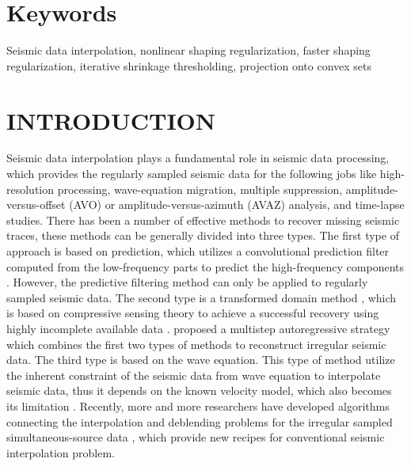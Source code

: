 \section{Keywords}
Seismic data interpolation, nonlinear shaping regularization, faster shaping regularization, iterative shrinkage thresholding, projection onto convex sets

\section{INTRODUCTION}
Seismic data interpolation plays a fundamental role in seismic data processing, which provides the regularly sampled seismic data for the following jobs like high-resolution processing, wave-equation migration, multiple suppression, amplitude-versus-offset (AVO) or amplitude-versus-azimuth (AVAZ) analysis, and time-lapse studies. There has been a number of effective methods to recover missing seismic traces, these methods can be generally divided into three types. The first type of approach is based on prediction, which utilizes a convolutional prediction filter computed from the low-frequency parts to predict the high-frequency components \cite[]{spitz1991,porsani1999,wang2002}. However, the predictive filtering method can only be applied to regularly sampled seismic data. The second type is a transformed domain method \cite[]{candes20061,abma2006,yangkang20142}, which is based on compressive sensing theory \cite[]{candes20062,donoho2006} to achieve a successful recovery using highly incomplete available data \cite[]{sacchi1998,wang2003,yangkang2014halfthr}. \cite{mostafa2007} proposed a multistep autoregressive strategy which combines the first two types of methods to reconstruct irregular seismic data. The third type is based on the wave equation. This type of method utilize the inherent constraint of the seismic data from wave equation to interpolate seismic data, thus it depends on the known velocity model, which also becomes its limitation \cite[]{canning1996,fomel2003}. Recently, more and more researchers have developed algorithms connecting the interpolation and deblending \cite[]{yangkang2014svmf,yangkang2014nmo} problems for the irregular sampled simultaneous-source data \cite[]{chengbo2013}, which provide new recipes for conventional seismic interpolation problem.

